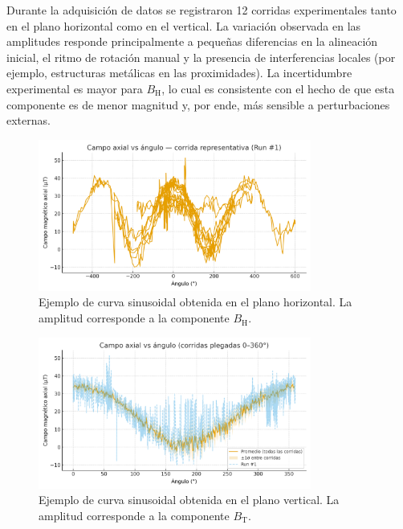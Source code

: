 \documentclass[12pt,a4paper]{article}
\begin{document}
\vspace{1em}
Durante la adquisición de datos se registraron 12 corridas experimentales tanto en el plano horizontal como en el vertical. La variación observada en las amplitudes responde principalmente a pequeñas diferencias en la alineación inicial, el ritmo de rotación manual y la presencia de interferencias locales (por ejemplo, estructuras metálicas en las proximidades). La incertidumbre experimental es mayor para \( B_\mathrm{H} \), lo cual es consistente con el hecho de que esta componente es de menor magnitud y, por ende, más sensible a perturbaciones externas.

\begin{figure}[H]
    \centering
    \includegraphics[width=0.8\textwidth]{figuras/grafico_horizontal.png}
    \caption{Ejemplo de curva sinusoidal obtenida en el plano horizontal. La amplitud corresponde a la componente \( B_\mathrm{H} \).}
    \label{fig:horizontal}
\end{figure}

\begin{figure}[H]
    \centering
    \includegraphics[width=0.8\textwidth]{figuras/grafico_vertical.png}
    \caption{Ejemplo de curva sinusoidal obtenida en el plano vertical. La amplitud corresponde a la componente \( B_\mathrm{T} \).}
    \label{fig:vertical}
\end{figure}
\end{document}
